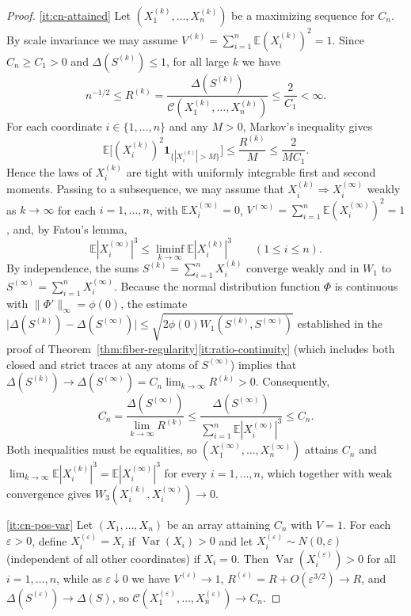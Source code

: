 \documentclass[11pt]{article}
\numberwithin{equation}{section}
\theoremstyle{definition}
\theoremstyle{remark}
\DeclareMathOperator{\Var}{Var}
\newcommand{\E}{\mathbb E}
\newcommand{\ind}{\mathbf1}
\newcommand{\phz}{\phi(0)}
\newcommand{\eps}{\varepsilon}
\begin{document}
\begin{proof}
\ref{it:cn-attained} Let $(X_1^{(k)},\ldots,X_n^{(k)})$ be a maximizing
sequence for $C_n$. By scale invariance we may assume
$V^{(k)}=\sum_{i=1}^n\E(X_i^{(k)})^2=1$. Since $C_n\ge C_1>0$ and
$\Delta(S^{(k)})\le1$, for all large $k$ we have
\[
 n^{-1/2}\le R^{(k)}=\frac{\Delta(S^{(k)})}{\mathcal C(X_1^{(k)},\ldots,X_n^{(k)})}
 \le\frac{2}{C_1}<\infty.
\]
For each coordinate $i\in\{1,\ldots,n\}$ and any $M>0$, Markov's inequality
gives
\[
 \E\bigl[(X_i^{(k)})^2\ind_{\{|X_i^{(k)}|>M\}}\bigr]
 \le\frac{R^{(k)}}{M}\le\frac{2}{MC_1}.
\]
Hence the laws of $X_i^{(k)}$ are tight with uniformly integrable first and
second moments. Passing to a subsequence, we may assume that
$X_i^{(k)}\Rightarrow X_i^{(\infty)}$ weakly as $k\to\infty$ for each
$i=1,\ldots,n$, with $\E X_i^{(\infty)}=0$,
$V^{(\infty)}=\sum_{i=1}^n\E(X_i^{(\infty)})^2=1$, and, by Fatou's lemma,
\[
 \E|X_i^{(\infty)}|^3\le\liminf_{k\to\infty}\E|X_i^{(k)}|^3\qquad(1\le i\le n).
\]
By independence, the sums $S^{(k)}=\sum_{i=1}^n X_i^{(k)}$ converge weakly and
in $W_1$ to $S^{(\infty)}=\sum_{i=1}^n X_i^{(\infty)}$. Because the normal
distribution function $\Phi$ is continuous with $\|\Phi'\|_\infty=\phz$, the
estimate $\bigl|\Delta(S^{(k)})-\Delta(S^{(\infty)})\bigr|\le\sqrt{2\phz W_1(S^{(k)},S^{(\infty)})}$
established in the proof of Theorem~\ref{thm:fiber-regularity}\ref{it:ratio-continuity}
(which includes both closed and strict traces at any atoms of $S^{(\infty)}$)
implies that $\Delta(S^{(k)})\to\Delta(S^{(\infty)})=C_n\lim_{k\to\infty}R^{(k)}>0$.
Consequently,
\[
 C_n=\frac{\Delta(S^{(\infty)})}{\lim_{k\to\infty}R^{(k)}}
 \le\frac{\Delta(S^{(\infty)})}{\sum_{i=1}^n\E|X_i^{(\infty)}|^3}\le C_n.
\]
Both inequalities must be equalities, so $(X_1^{(\infty)},\ldots,X_n^{(\infty)})$
attains $C_n$ and $\lim_{k\to\infty}\E|X_i^{(k)}|^3=\E|X_i^{(\infty)}|^3$ for
every $i=1,\ldots,n$, which together with weak convergence gives
$W_3(X_i^{(k)},X_i^{(\infty)})\to0$.

\ref{it:cn-pos-var} Let $(X_1,\ldots,X_n)$ be an array attaining $C_n$ with
$V=1$. For each $\eps>0$, define $X_i^{(\eps)}=X_i$ if $\Var(X_i)>0$ and let
$X_i^{(\eps)}\sim N(0,\eps)$ (independent of all other coordinates) if
$X_i=0$. Then $\Var(X_i^{(\eps)})>0$ for all $i=1,\ldots,n$, while as
$\eps\downarrow0$ we have $V^{(\eps)}\to 1$,
$R^{(\eps)}=R+O(\eps^{3/2})\to R$, and
$\Delta(S^{(\eps)})\to\Delta(S)$, so
$\mathcal C(X_1^{(\eps)},\ldots,X_n^{(\eps)})\to C_n$.
\end{proof}
\end{document}
